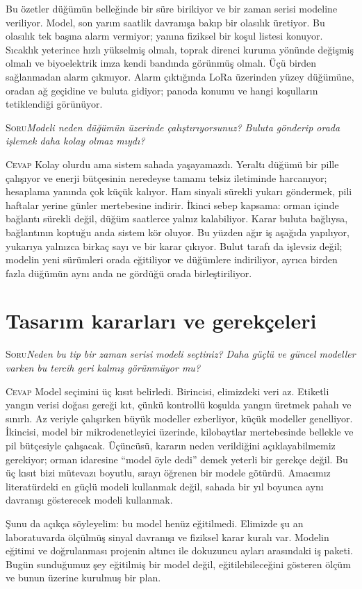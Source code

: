 \documentclass[11pt,a4paper]{article}
\newcommand{\soru}[1]{%
  \par\vskip 15pt plus 4pt minus 2pt
  \noindent\textcolor{ember}{\textsc{Soru}}\quad\emph{#1}%
  \par\vskip 6pt\noindent\textcolor{myco}{\textsc{Cevap}}\quad\ignorespaces}
\begin{document}
Bu özetler düğümün belleğinde bir süre birikiyor ve bir zaman serisi
modeline veriliyor. Model, son yarım saatlik davranışa bakıp bir
olasılık üretiyor. Bu olasılık tek başına alarm vermiyor; yanına
fiziksel bir koşul listesi konuyor. Sıcaklık yeterince hızlı yükselmiş
olmalı, toprak direnci kuruma yönünde değişmiş olmalı ve biyoelektrik
imza kendi bandında görünmüş olmalı. Üçü birden sağlanmadan alarm
çıkmıyor. Alarm çıktığında LoRa üzerinden yüzey düğümüne, oradan ağ
geçidine ve buluta gidiyor; panoda konumu ve hangi koşulların
tetiklendiği görünüyor.

\soru{Modeli neden düğümün üzerinde çalıştırıyorsunuz? Buluta gönderip
orada işlemek daha kolay olmaz mıydı?}
Kolay olurdu ama sistem sahada yaşayamazdı. Yeraltı düğümü bir pille
çalışıyor ve enerji bütçesinin neredeyse tamamı telsiz iletiminde
harcanıyor; hesaplama yanında çok küçük kalıyor. Ham sinyali sürekli
yukarı göndermek, pili haftalar yerine günler mertebesine indirir.
İkinci sebep kapsama: orman içinde bağlantı sürekli değil, düğüm
saatlerce yalnız kalabiliyor. Karar buluta bağlıysa, bağlantının
koptuğu anda sistem kör oluyor. Bu yüzden ağır iş aşağıda yapılıyor,
yukarıya yalnızca birkaç sayı ve bir karar çıkıyor. Bulut tarafı da
işlevsiz değil; modelin yeni sürümleri orada eğitiliyor ve düğümlere
indiriliyor, ayrıca birden fazla düğümün aynı anda ne gördüğü orada
birleştiriliyor.

\section*{Tasarım kararları ve gerekçeleri}

\soru{Neden bu tip bir zaman serisi modeli seçtiniz? Daha güçlü ve
güncel modeller varken bu tercih geri kalmış görünmüyor mu?}
Model seçimini üç kısıt belirledi. Birincisi, elimizdeki veri az.
Etiketli yangın verisi doğası gereği kıt, çünkü kontrollü koşulda
yangın üretmek pahalı ve sınırlı. Az veriyle çalışırken büyük modeller
ezberliyor, küçük modeller genelliyor. İkincisi, model bir mikrodenetleyici
üzerinde, kilobaytlar mertebesinde bellekle ve pil bütçesiyle çalışacak.
Üçüncüsü, kararın neden verildiğini açıklayabilmemiz gerekiyor; orman
idaresine ``model öyle dedi'' demek yeterli bir gerekçe değil. Bu üç
kısıt bizi mütevazı boyutlu, sırayı öğrenen bir modele götürdü. Amacımız
literatürdeki en güçlü modeli kullanmak değil, sahada bir yıl boyunca
aynı davranışı gösterecek modeli kullanmak.

Şunu da açıkça söyleyelim: bu model henüz eğitilmedi. Elimizde şu an
laboratuvarda ölçülmüş sinyal davranışı ve fiziksel karar kuralı var.
Modelin eğitimi ve doğrulanması projenin altıncı ile dokuzuncu ayları
arasındaki iş paketi. Bugün sunduğumuz şey eğitilmiş bir model değil,
eğitilebileceğini gösteren ölçüm ve bunun üzerine kurulmuş bir plan.
\end{document}
